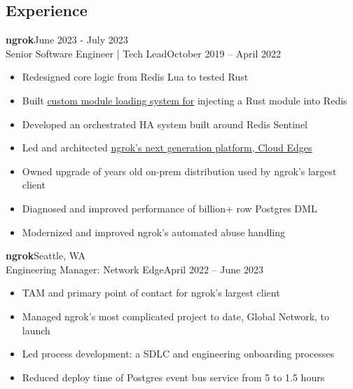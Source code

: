 \documentclass[margin]{res}
\begin{document}
  \begin{resume}
    \section{Experience}
       \textbf{ngrok}\hfill June 2023 - July 2023\\
         Senior Software Engineer | Tech Lead\hfill October 2019 -- April 2022\\
         \begin{itemize} \itemsep -1pt  %
            \item Redesigned core logic from Redis Lua to tested Rust
            \item Built \href{https://github.com/brhoades/redis-loadmodbytes}{custom module loading system for} injecting a Rust module into Redis
            \item Developed an orchestrated HA system built around Redis Sentinel
            \item Led and architected \href{https://ngrok.com/next-generation}{ngrok's next generation platform, Cloud Edges}
            \item Owned upgrade of years old on-prem distribution used by ngrok's largest client
            \item Diagnosed and improved performance of billion+ row Postgres DML
            \item Modernized and improved ngrok's automated abuse handling
         \end{itemize}

       \textbf{ngrok}\hfill Seattle, WA\\
         Engineering Manager: Network Edge\hfill April 2022 -- June 2023\\
         \begin{itemize} \itemsep -1pt  %
            \item TAM and primary point of contact for ngrok's largest client
            \item Managed ngrok's most complicated project to date, Global Network, to launch
            \item Led process development: a SDLC and engineering onboarding processes
            \item Reduced deploy time of Postgres event bus service from 5 to 1.5 hours
         \end{itemize}



\end{resume}
\end{document}
